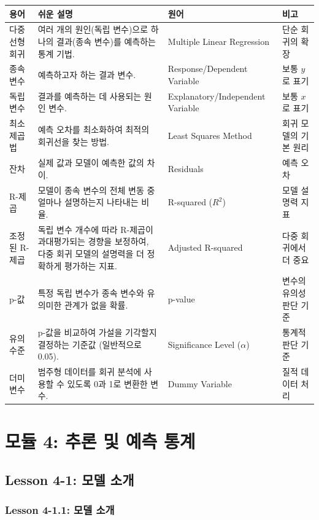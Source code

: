 \documentclass[11pt,a4paper]{article}
\begin{document}
\begin{termbox}
\begin{tabular}{p{} p{} p{} p{}}
\toprule
\textbf{용어} & \textbf{쉬운 설명} & \textbf{원어} & \textbf{비고} \\
\midrule
다중 선형 회귀 & 여러 개의 원인(독립 변수)으로 하나의 결과(종속 변수)를 예측하는 통계 기법. & Multiple Linear Regression & 단순 회귀의 확장 \\
종속 변수 & 예측하고자 하는 결과 변수. & Response/Dependent Variable & 보통 $y$로 표기 \\
독립 변수 & 결과를 예측하는 데 사용되는 원인 변수. & Explanatory/Independent Variable & 보통 $x$로 표기 \\
최소 제곱법 & 예측 오차를 최소화하여 최적의 회귀선을 찾는 방법. & Least Squares Method & 회귀 모델의 기본 원리 \\
잔차 & 실제 값과 모델이 예측한 값의 차이. & Residuals & 예측 오차 \\
R-제곱 & 모델이 종속 변수의 전체 변동 중 얼마나 설명하는지 나타내는 비율. & R-squared ($R^2$) & 모델 설명력 지표 \\
조정된 R-제곱 & 독립 변수 개수에 따라 R-제곱이 과대평가되는 경향을 보정하여, 다중 회귀 모델의 설명력을 더 정확하게 평가하는 지표. & Adjusted R-squared & 다중 회귀에서 더 중요 \\
p-값 & 특정 독립 변수가 종속 변수와 유의미한 관계가 없을 확률. & p-value & 변수의 유의성 판단 기준 \\
유의 수준 & p-값을 비교하여 가설을 기각할지 결정하는 기준값 (일반적으로 0.05). & Significance Level ($\alpha$) & 통계적 판단 기준 \\
더미 변수 & 범주형 데이터를 회귀 분석에 사용할 수 있도록 0과 1로 변환한 변수. & Dummy Variable & 질적 데이터 처리 \\
\bottomrule
\end{tabular}
\end{termbox}

\newpage
\section{모듈 4: 추론 및 예측 통계}

\subsection{Lesson 4-1: 모델 소개}

\subsubsection{Lesson 4-1.1: 모델 소개}
\end{document}
